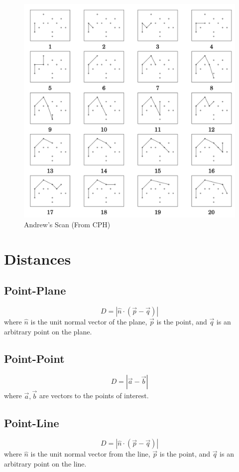 \documentclass{article}
\begin{document}
\begin{figure}[h!]
\centering
\includegraphics[scale=.5]{Andrew's Scan.png}
\caption{Andrew's Scan (From CPH)}
\label{fig:Convex Hull}
\end{figure}

\section{Distances}
\subsection{Point-Plane}
$$D=|\hat{n}\cdot(\vec{p}-\vec{q})|$$
where $\hat{n}$ is the unit normal vector of the plane, $\vec{p}$ is the point, and $\vec{q}$ is an arbitrary point on the plane.
\subsection{Point-Point}
$$D=|\vec{a}-\vec{b}|$$
where $\vec{a},\vec{b}$ are vectors to the points of interest.
\subsection{Point-Line}
$$D=|\hat{n}\cdot(\vec{p}-\vec{q})|$$
where $\hat{n}$ is the unit normal vector from the line, $\vec{p}$ is the point, and $\vec{q}$ is an arbitrary point on the line.
\end{document}
